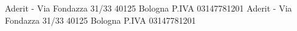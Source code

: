 Aderit - Via Fondazza 31/33 40125 Bologna P.IVA 03147781201
Aderit - Via Fondazza 31/33 40125 Bologna P.IVA 03147781201

